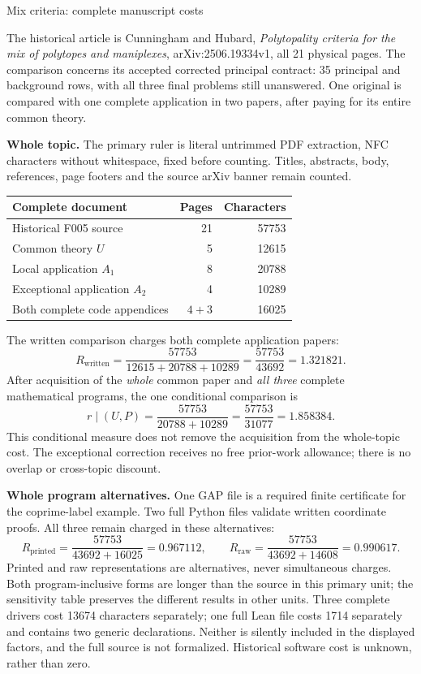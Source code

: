 \documentclass[11pt,a4paper]{article}
\begin{document}
\begin{center}{\Large Mix criteria: complete manuscript costs}\end{center}
The historical article is Cunningham and Hubard, \emph{Polytopality criteria
for the mix of polytopes and maniplexes}, arXiv:2506.19334v1, all 21 physical
pages. The comparison concerns its accepted corrected principal contract:
35 principal and background rows, with all three final problems still
unanswered. One original is compared with one complete application in two
papers, after paying for its entire common theory.

\textbf{Whole topic.} The primary ruler is literal untrimmed PDF extraction,
NFC characters without whitespace, fixed before counting. Titles, abstracts,
body, references, page footers and the source arXiv banner remain counted.
\begin{center}\begin{tabular}{lrr}\toprule
Complete document & Pages & Characters\\\midrule
Historical F005 source & 21 & 57753\\
Common theory $U$ & 5 & 12615\\
Local application $A_1$ & 8 & 20788\\
Exceptional application $A_2$ & 4 & 10289\\
Both complete code appendices & $4+3$ & 16025\\\bottomrule
\end{tabular}\end{center}
The written comparison charges both complete application papers:
\[
 R_{\mathrm{written}}=\frac{57753}{12615+20788+10289}
 =\frac{57753}{43692}=1.321821.
\]
After acquisition of the \emph{whole} common paper and \emph{all three}
complete mathematical programs, the one conditional comparison is
\[
 r\mid(U,P)=\frac{57753}{20788+10289}=\frac{57753}{31077}=1.858384.
\]
This conditional measure does not remove the acquisition from the whole-topic
cost. The exceptional correction receives no free prior-work allowance;
there is no overlap or cross-topic discount.

\textbf{Whole program alternatives.} One GAP file is a required finite
certificate for the coprime-label example. Two full Python files validate
written coordinate proofs. All three remain charged in these alternatives:
\[
 R_{\mathrm{printed}}=\frac{57753}{43692+16025}=0.967112,
 \qquad
 R_{\mathrm{raw}}=\frac{57753}{43692+14608}=0.990617.
\]
Printed and raw representations are alternatives, never simultaneous charges.
Both program-inclusive forms are longer than the source in this primary unit;
the sensitivity table preserves the different results in other units.
Three complete drivers cost 13674 characters separately; one full Lean
file costs 1714 separately and contains two generic declarations. Neither
is silently included in the displayed factors, and the full source is not
formalized. Historical software cost is unknown, rather than zero.
\end{document}

